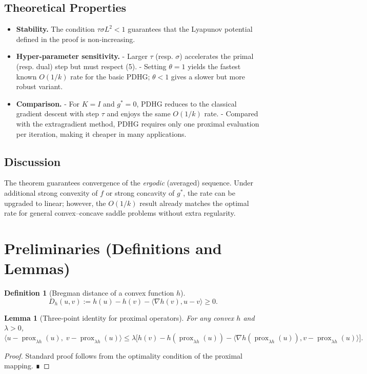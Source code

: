 \documentclass{article}
\newtheorem{lemma}{Lemma}
\newtheorem{definition}{Definition}
\newcommand{\prox}{\operatorname{prox}}
\begin{document}
\subsection*{Theoretical Properties}
\begin{itemize}
\item \textbf{Stability.} The condition $\tau\sigma L^{2}<1$ guarantees that the Lyapunov
potential defined in the proof is non‑increasing.
\item \textbf{Hyper‑parameter sensitivity.}
  - Larger $\tau$ (resp. $\sigma$) accelerates the primal (resp. dual) step but must respect (5).  
  - Setting $\theta=1$ yields the fastest known $O(1/k)$ rate for the basic PDHG; $\theta<1$ gives a slower but more robust variant.
\item \textbf{Comparison.}
  - For $K=I$ and $g^{*}=0$, PDHG reduces to the classical gradient descent with step $\tau$ and enjoys the same $O(1/k)$ rate.  
  - Compared with the extragradient method, PDHG requires only one proximal evaluation per iteration, making it cheaper in many applications.
\end{itemize}

\subsection*{Discussion}
The theorem guarantees convergence of the \emph{ergodic} (averaged) sequence. Under additional strong convexity of $f$ or strong concavity of $g^{*}$, the rate can be upgraded to linear; however, the $O(1/k)$ result already matches the optimal rate for general convex–concave saddle problems without extra regularity.

\section*{Preliminaries (Definitions and Lemmas)}
\begin{definition}[Bregman distance of a convex function $h$]
\[
D_{h}(u,v):=h(u)-h(v)-\langle\nabla h(v),u-v\rangle\ge 0.
\]
\end{definition}

\begin{lemma}[Three‑point identity for proximal operators]\label{lem:prox}
For any convex $h$ and $\lambda>0$,
\[
\langle u-\prox_{\lambda h}(u),\;v-\prox_{\lambda h}(u)\rangle
\le \lambda\bigl[ h(v)-h(\prox_{\lambda h}(u)) -\langle\nabla h(\prox_{\lambda h}(u)),v-\prox_{\lambda h}(u)\rangle\bigr].
\tag{8}
\]
\end{lemma}
\begin{proof}
Standard proof follows from the optimality condition of the proximal mapping. ∎
\end{proof}
\end{document}
